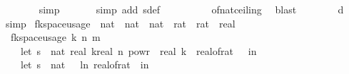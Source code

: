\begin{isabellebody}
\ \ \ \ \ \ \isamarkupfalse%
\ {\isacharparenleft}{\kern0pt}simp{\isacharparenright}{\kern0pt}\isanewline
\ \ \ \ \ \isamarkupfalse%
\ {\isacharparenleft}{\kern0pt}simp\ add{\isacharcolon}{\kern0pt}\ sdef{\isacharparenright}{\kern0pt}\ \isanewline
\ \ \ \ \ \ \ \isamarkupfalse%
\ of{\isacharunderscore}{\kern0pt}nat{\isacharunderscore}{\kern0pt}ceiling\ \isamarkupfalse%
\ blast\ \isanewline
\ \ \ \ \ \isamarkupfalse%
\ d\ \isamarkupfalse%
\ simp\isanewline
{}\isamarkupfalse%
%
\endisatagproof
{\isafoldproof}%
%
\isadelimproof
\isanewline
%
\endisadelimproof
\isanewline
{}\isamarkupfalse%
\ fk{\isacharunderscore}{\kern0pt}space{\isacharunderscore}{\kern0pt}usage\ {\isacharcolon}{\kern0pt}{\isacharcolon}{\kern0pt}\ {\isachardoublequoteopen}{\isacharparenleft}{\kern0pt}nat\ {\isasymtimes}\ nat\ {\isasymtimes}\ nat\ {\isasymtimes}\ rat\ {\isasymtimes}\ rat{\isacharparenright}{\kern0pt}\ {\isasymRightarrow}\ real{\isachardoublequoteclose}\ \isanewline
\ \ {\isachardoublequoteopen}fk{\isacharunderscore}{\kern0pt}space{\isacharunderscore}{\kern0pt}usage\ {\isacharparenleft}{\kern0pt}k{\isacharcomma}{\kern0pt}\ n{\isacharcomma}{\kern0pt}\ m{\isacharcomma}{\kern0pt}\ {\isasymepsilon}{\isacharcomma}{\kern0pt}\ {\isasymdelta}{\isacharparenright}{\kern0pt}\ {\isacharequal}{\kern0pt}\ {\isacharparenleft}{\kern0pt}\isanewline
\ \ \ \ let\ s\ {\isacharequal}{\kern0pt}\ nat\ {\isasymlceil}{}{\isacharasterisk}{\kern0pt}real\ k{\isacharasterisk}{\kern0pt}{\isacharparenleft}{\kern0pt}real\ n{\isacharparenright}{\kern0pt}\ powr\ {\isacharparenleft}{\kern0pt}{}{\isacharminus}{\kern0pt}{}{\isacharslash}{\kern0pt}\ real\ k{\isacharparenright}{\kern0pt}\ {\isacharslash}{\kern0pt}\ {\isacharparenleft}{\kern0pt}real{\isacharunderscore}{\kern0pt}of{\isacharunderscore}{\kern0pt}rat\ {\isasymdelta}{\isacharparenright}{\kern0pt}\ {\isasymrceil}\ in\isanewline
\ \ \ \ let\ s\ {\isacharequal}{\kern0pt}\ nat\ {\isasymlceil}{\isacharminus}{\kern0pt}{\isacharparenleft}{\kern0pt}{}{}\ {\isacharasterisk}{\kern0pt}\ ln\ {\isacharparenleft}{\kern0pt}real{\isacharunderscore}{\kern0pt}of{\isacharunderscore}{\kern0pt}rat\ {\isasymepsilon}{\isacharparenright}{\kern0pt}{\isacharparenright}{\kern0pt}{\isasymrceil}\ in\ \isanewline
\ \ \ \ {}\ {\isacharplus}{\kern0pt}\isanewline

\end{isabellebody}
